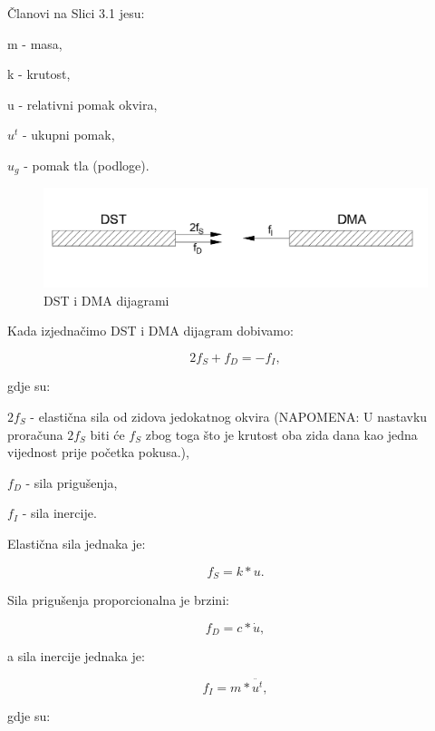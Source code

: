 \documentclass[12pt]{book}
\begin{document}
\newpage

Članovi na Slici 3.1 jesu:

m - masa,

k - krutost,

u - relativni pomak okvira,

$u^t$ - ukupni pomak,

$u_g$ - pomak tla (podloge).


\begin{figure}[h]
	\centering
	\includegraphics[width=1\linewidth]{Slike/screenshot002}
	\caption{DST i DMA dijagrami}
	\label{fig:screenshot002}
\end{figure}

Kada izjednačimo DST i DMA dijagram dobivamo:

\begin{equation}\label{Jednadžba 3.1}
	2f_S + f_D = - f_I,
\end{equation}

gdje su:

$2f_S$ - elastična sila od zidova jedokatnog okvira (NAPOMENA: U nastavku proračuna $2f_S$ biti će $f_S$ zbog toga što je krutost oba zida dana kao jedna vijednost prije početka pokusa.),

$f_D$ - sila prigušenja,

$f_I$ - sila inercije.

Elastična sila jednaka je:

\begin{equation}\label{Jednadžba 3.2}
	f_S = k*u.
\end{equation}

Sila prigušenja proporcionalna je brzini:

\begin{equation}\label{Jednadžba 3.3}
	f_D = c*\dot{u},
\end{equation}

a sila inercije jednaka je:

\begin{equation}\label{Jednadžba 3.4}
	f_I = m * \ddot{u^t},
\end{equation}

gdje su:
\end{document}
